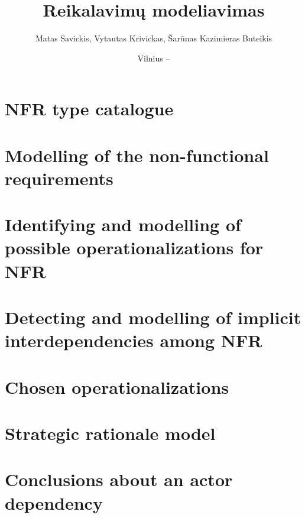 \documentclass{VUMIFPSkursinis}
\title{Reikalavimų modeliavimas}
\author{Matas Savickis, Vytautas Krivickas, Šarūnas Kazimieras Buteikis}
\date{Vilnius – \the\year}
\begin{document}
\maketitle

\tableofcontents

\section{NFR type catalogue}

\section{Modelling of the non-functional requirements}

\section{Identifying and modelling of possible operationalizations for NFR}

\section{Detecting and modelling of implicit interdependencies among NFR}

\section{Chosen operationalizations}

\section{Strategic rationale model}

\section{Conclusions about an actor dependency}

\end{document}
